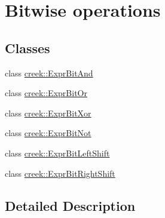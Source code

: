 \hypertarget{group__expression__bitwise}{}\section{Bitwise operations}
\label{group__expression__bitwise}
\subsection*{Classes}
\begin{DoxyCompactItemize}
\item 
class \hyperlink{classcreek_1_1_expr_bit_and}{creek\+::\+Expr\+Bit\+And}
\item 
class \hyperlink{classcreek_1_1_expr_bit_or}{creek\+::\+Expr\+Bit\+Or}
\item 
class \hyperlink{classcreek_1_1_expr_bit_xor}{creek\+::\+Expr\+Bit\+Xor}
\item 
class \hyperlink{classcreek_1_1_expr_bit_not}{creek\+::\+Expr\+Bit\+Not}
\item 
class \hyperlink{classcreek_1_1_expr_bit_left_shift}{creek\+::\+Expr\+Bit\+Left\+Shift}
\item 
class \hyperlink{classcreek_1_1_expr_bit_right_shift}{creek\+::\+Expr\+Bit\+Right\+Shift}
\end{DoxyCompactItemize}


\subsection{Detailed Description}
